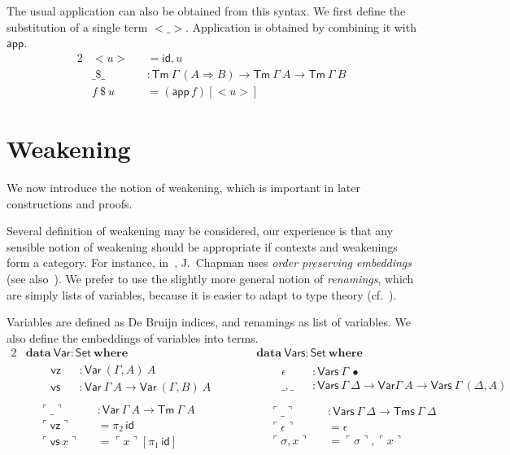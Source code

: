 \documentclass[a4paper,english,cleveref,autoref,draft]{lipics-v2019}
\newcommand{\agdaSymb}[1]{\mathsf{#1}}
\newcommand{\agdaKW}[1]{\mathbf{#1}}
\newcommand{\ind}{\hspace{1em}}
\newcommand{\data}{\agdaKW{data}}
\newcommand{\where}{\agdaKW{where}}
\newcommand{\Set}{\agdaSymb{Set}}
\newcommand{\Tms}{\agdaSymb{Tms}}
\newcommand{\Tm}{\agdaSymb{Tm}}
\newcommand{\id}{\agdaSymb{id}}
\newcommand{\app}{\agdaSymb{app}}
\newcommand{\vz}{\agdaSymb{vz}}
\newcommand{\vs}{\agdaSymb{vs}}
\newcommand{\Var}{\agdaSymb{Var}}
\newcommand{\Vars}{\agdaSymb{Vars}}
\newcommand{\cul}{\ulcorner}
\newcommand{\cur}{\urcorner}
\newcommand{\Ra}{\Rightarrow}
\begin{document}
The usual application can also be obtained from this syntax.
We first define the substitution of a single term $<\_>$.
Application is obtained by combining it with $\app$.
\begin{alignat*}{2}
  & <u> && = \id , u \\
  & \_\$\_ && : \Tm\ \Gamma\ (A \Ra B) \to \Tm\ \Gamma\ A \to \Tm\ \Gamma\ B \\
  & f\ \$\ u && = (\app\, f)[<u>]
\end{alignat*}


\section{Weakening}
We now introduce the notion of weakening, which is important in later
constructions and proofs.

Several definition of weakening may be considered, our experience is that any
sensible notion of weakening should be appropriate if contexts and weakenings
form a category. For instance, in~\cite{chapman2009normalisation}, J.~Chapman
uses \emph{order preserving embeddings} (see also~\cite{altenkirch1995categorical}).
We prefer to use the slightly more general notion of \emph{renamings}, which are
simply lists of variables, because it is easier to adapt to type theory
(cf.~\cite{kaposi2016normalisation}).

Variables are defined as De Bruijn indices, and renamings as list of variables.
We also define the embeddings of variables into terms.
\begin{alignat*}{2}
  & \data\ \Var : \Set\ \where && \data\ \Vars : \Set\ \where \\ & \ind
  \begin{alignedat}{2}
    & \vz && : \Var\ (\Gamma,A)\ A \\
    & \vs && : \Var\ \Gamma\ A \to \Var\ (\Gamma,B)\ A \qquad
  \end{alignedat} && \ind
  \begin{alignedat}{2}
    & \epsilon && : \Vars\ \Gamma\ \bullet \\
    & \_,\_ && : \Vars\ \Gamma\ \Delta \to \Var \Gamma\ A \to \Vars\ \Gamma\ (\Delta,A)
  \end{alignedat} \\ &
  \begin{alignedat}{2}
    & \cul\_\cur && : \Var\ \Gamma\ A \to \Tm\ \Gamma\ A \\
    & \cul \vz \cur && = \pi_2\,\id \\
    & \cul \vs\,x \cur && = \cul x \cur [\pi_1\,\id]
  \end{alignedat} &&
  \begin{alignedat}{2}
    & \cul\_\cur  && : \Vars\ \Gamma\ \Delta \to \Tms\ \Gamma\ \Delta \\
    & \cul \epsilon \cur && = \epsilon \\
    & \cul \sigma,x \cur && = \cul \sigma \cur , \cul x \cur
  \end{alignedat}
\end{alignat*}
\end{document}
